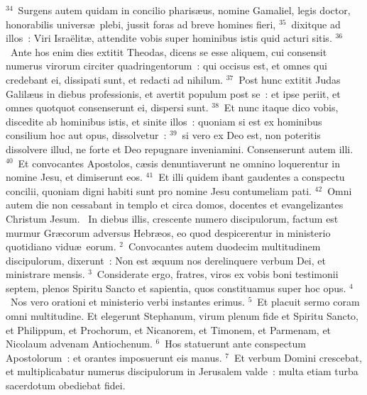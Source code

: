 ${}^{34}$~Surgens autem quidam in concilio pharis\ae us, nomine Gamaliel, legis doctor, honorabilis univers\ae\ plebi, jussit foras ad breve homines fieri,
${}^{35}$~dixitque ad illos~: Viri Isra\"elit\ae , attendite vobis super hominibus istis quid acturi sitis.
${}^{36}$~Ante hos enim dies extitit Theodas, dicens se esse aliquem, cui consensit numerus virorum circiter quadringentorum~: qui occisus est, et omnes qui credebant ei, dissipati sunt, et redacti ad nihilum.
${}^{37}$~Post hunc extitit Judas Galil\ae us in diebus professionis, et avertit populum post se~: et ipse periit, et omnes quotquot consenserunt ei, dispersi sunt.
${}^{38}$~Et nunc itaque dico vobis, discedite ab hominibus istis, et sinite illos~: quoniam si est ex hominibus consilium hoc aut opus, dissolvetur~:
${}^{39}$~si vero ex Deo est, non poteritis dissolvere illud, ne forte et Deo repugnare inveniamini. Consenserunt autem illi.
${}^{40}$~Et convocantes Apostolos, c\ae sis denuntiaverunt ne omnino loquerentur in nomine Jesu, et dimiserunt eos.
${}^{41}$~Et illi quidem ibant gaudentes a conspectu concilii, quoniam digni habiti sunt pro nomine Jesu contumeliam pati.
${}^{42}$~Omni autem die non cessabant in templo et circa domos, docentes et evangelizantes Christum Jesum.
~In diebus illis, crescente numero discipulorum, factum est murmur Gr\ae corum adversus Hebr\ae os, eo quod despicerentur in ministerio quotidiano vidu\ae\ eorum.
${}^{2}$~Convocantes autem duodecim multitudinem discipulorum, dixerunt~: Non est \ae quum nos derelinquere verbum Dei, et ministrare mensis.
${}^{3}$~Considerate ergo, fratres, viros ex vobis boni testimonii septem, plenos Spiritu Sancto et sapientia, quos constituamus super hoc opus.
${}^{4}$~Nos vero orationi et ministerio verbi instantes erimus.
${}^{5}$~Et placuit sermo coram omni multitudine. Et elegerunt Stephanum, virum plenum fide et Spiritu Sancto, et Philippum, et Prochorum, et Nicanorem, et Timonem, et Parmenam, et Nicolaum advenam Antiochenum.
${}^{6}$~Hos statuerunt ante conspectum Apostolorum~: et orantes imposuerunt eis manus.
${}^{7}$~Et verbum Domini crescebat, et multiplicabatur numerus discipulorum in Jerusalem valde~: multa etiam turba sacerdotum obediebat fidei.


